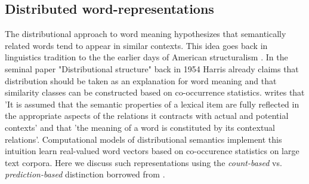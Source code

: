 \subsection{Distributed word-representations}
\label{sec:words}
The distributional approach to word meaning hypothesizes that semantically related words
tend to appear in similar contexts. This idea goes back in linguistics tradition to the the
earlier days of American structuralism \cite{nevin2002legacy}. In the seminal paper
"Distributional structure" \cite{harris1954distributional} back in 1954 Harris already claims
that distribution should be taken as an explanation for word meaning and that similarity classes
can be constructed based on co-occurrence statistics.
\cite{cruse1986lexical} writes that 'It is  assumed  that  the  semantic properties  of
a lexical  item  are  fully  reflected  in  the  appropriate  aspects  of  the  relations
it  contracts  with  actual  and  potential  contexts' and that 'the  meaning  of  a word
is constituted  by  its  contextual  relations'. Computational models of distributional
semantics implement this intuition learn real-valued word vectors based on co-occurence
statistics on large text corpora. Here we discuss such representations using the \emph{count-based}
vs. \emph{prediction-based} distinction borrowed from \cite{baroni2014don}.

